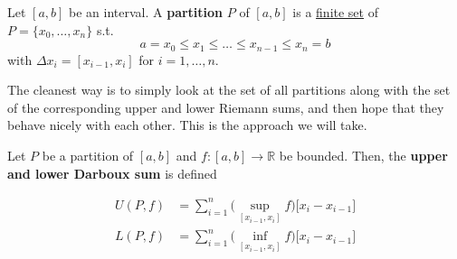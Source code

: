   \begin{definition}[Partition]
    \label{def:partition}
    Let $[a, b]$ be an interval. A \textbf{partition} $P$ of $[a, b]$ is a \hyperref[st-def:finite-set]{finite set} of $P = \{x_0, \ldots, x_n\}$ s.t. 
    \begin{equation}
      a = x_0 \leq x_1 \leq \ldots \leq x_{n-1} \leq x_n = b
    \end{equation}
    with $\Delta x_i = [x_{i-1}, x_i]$ for $i = 1, \ldots, n$. 
  \end{definition} 

  The cleanest way is to simply look at the set of all partitions along with the set of the corresponding upper and lower Riemann sums, and then hope that they behave nicely with each other. This is the approach we will take. 

  \begin{definition}
    \label{def:darboux-sums-with-respect-to-partition}
    Let $P$ be a partition of $[a, b]$ and $f: [a, b] \to \mathbb{R}$ be bounded. Then, the \textbf{upper and lower Darboux sum} is defined 

    \begin{align}
      U(P, f) & = \sum_{i=1}^n \Big( \sup_{[x_{i-1}, x_i]} f \Big) \big[ x_i - x_{i-1} \big] \\ 
      L(P, f) & = \sum_{i=1}^n \Big( \inf_{[x_{i-1}, x_i]} f \Big) \big[ x_i - x_{i-1} \big] 
    \end{align}

    \begin{figure}[H]
      \centering
      \begin{subfigure}[b]{0.48\textwidth}
        \centering
\end{subfigure}
\end{figure}
\end{definition}

